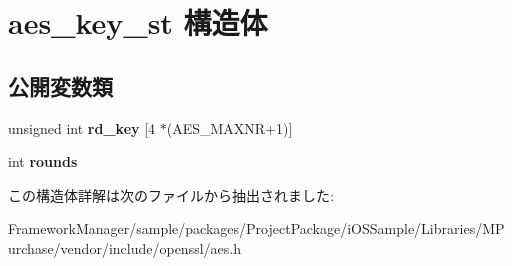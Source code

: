 \hypertarget{structaes__key__st}{}\section{aes\+\_\+key\+\_\+st 構造体}
\label{structaes__key__st}
\subsection*{公開変数類}
\begin{DoxyCompactItemize}
\item 
\hypertarget{structaes__key__st_a4746bac89cfc3a3bc9c8bd6a8a47db59}{}unsigned int {\bfseries rd\+\_\+key} \mbox{[}4 $\ast$(A\+E\+S\+\_\+\+M\+A\+X\+N\+R+1)\mbox{]}\label{structaes__key__st_a4746bac89cfc3a3bc9c8bd6a8a47db59}

\item 
\hypertarget{structaes__key__st_aa87061a8d8d0b11de2933ee88cb91f18}{}int {\bfseries rounds}\label{structaes__key__st_aa87061a8d8d0b11de2933ee88cb91f18}

\end{DoxyCompactItemize}


この構造体詳解は次のファイルから抽出されました\+:\begin{DoxyCompactItemize}
\item 
Framework\+Manager/sample/packages/\+Project\+Package/i\+O\+S\+Sample/\+Libraries/\+M\+Purchase/vendor/include/openssl/aes.\+h\end{DoxyCompactItemize}
